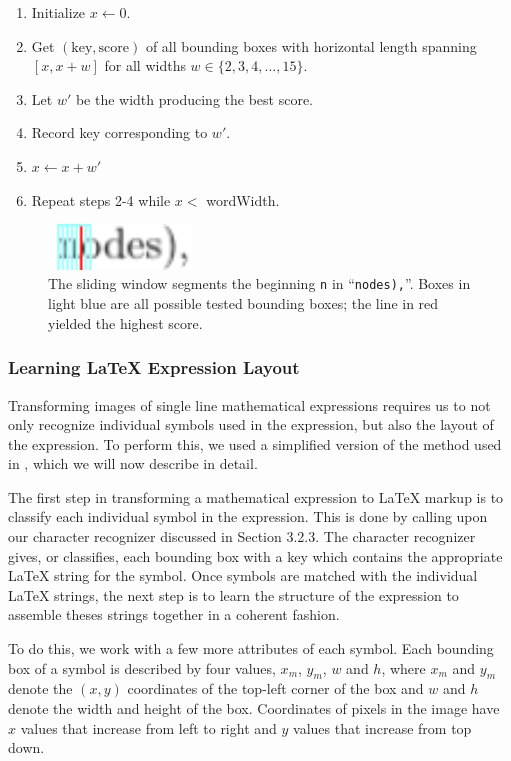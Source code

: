 \documentclass[10pt]{IEEEtran}
\newcommand{\latex}{\LaTeX\xspace}
\begin{document}
\begin{enumerate}
\item Initialize $x \leftarrow 0$.
\item Get $(\text{key},\text{score})$ of all bounding boxes with horizontal length spanning $[x, x+w]$ for all widths $w \in \{2,3,4,\dots,15\}$.
\item Let $w'$ be the width producing the best score.
\item Record key corresponding to $w'$.
\item $x \leftarrow x + w'$
\item Repeat steps 2-4 while $x <$ wordWidth.
\end{enumerate}

\begin{figure}[h]
  \centering
    \includegraphics[width=1.5in]{word1-window.png}
  \caption{The sliding window segments the beginning \texttt{n} in ``\texttt{nodes),}''. Boxes in light blue are all possible tested bounding boxes; the line in red yielded the highest score.}
  \label{fig:wordWindow1}
\end{figure}

\subsubsection{Learning \latex Expression Layout}

Transforming images of single line mathematical expressions requires us to not only recognize individual symbols used in the expression, but also the layout of the expression. To perform this, we used a simplified version of the method used in \cite{4}, which we will now describe in detail.

The first step in transforming a mathematical expression to \latex markup is to classify each individual symbol in the expression. This is done by calling upon our character recognizer discussed in Section 3.2.3. The character recognizer gives, or classifies, each bounding box with a key which contains the appropriate \latex string for the symbol. Once symbols are matched with the individual \latex strings, the next step is to learn the structure of the expression to assemble theses strings together in a coherent fashion.

To do this, we work with a few more attributes of each symbol. Each bounding box of a symbol is described by four values, $x_m$, $y_m$, $w$ and $h$, where $x_m$ and $y_m$ denote the $(x,y)$ coordinates of the top-left corner of the box and $w$ and $h$ denote the width and height of the box. Coordinates of pixels in the image have $x$ values that increase from left to right and $y$ values that increase from top down.
\end{document}
